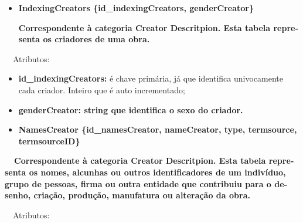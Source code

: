 \documentclass[letterpaper]{article}
\newcommand\textstyleStrongEmphasis[1]{\textbf{#1}}
\newcommand\liststyleLi{%
\renewcommand\labelitemi{{\textbullet}}
\renewcommand\labelitemii{[27A2?]}
\renewcommand\labelitemiii{{\textbullet}}
\renewcommand\labelitemiv{{\textbullet}}
}
\newcommand\liststyleLxiii{%
\renewcommand\labelitemi{[27A2?]}
\renewcommand\labelitemii{[27A2?]}
\renewcommand\labelitemiii{[27A2?]}
\renewcommand\labelitemiv{[27A2?]}
}
\begin{document}
\bigskip

\liststyleLi
\begin{itemize}
\item {\bfseries
IndexingCreators\textmd{ \{}\textmd{id\_indexingCreators}\textmd{,
genderCreator\}}}

{\bfseries
\foreignlanguage{english}{\textmd{Correspondente \`a categoria
}}\textstyleStrongEmphasis{\foreignlanguage{english}{Creator
Descritpion}}\foreignlanguage{english}{\textmd{. Esta
}}\textstyleStrongEmphasis{\foreignlanguage{english}{\textmd{tabela}}}\foreignlanguage{english}{\textmd{
representa os criadores de uma obra.}}}
\end{itemize}

\bigskip

{
\ \ Atributos:}

\liststyleLxiii
\begin{itemize}
\item {
\textbf{id\_indexingCreators:} \'e chave prim\'aria, j\'a que identifica
univocamente cada criador. Inteiro que \'e auto incrementado;}
\item {\bfseries
genderCreator:\textmd{ string que identifica o sexo do criador.}}
\end{itemize}

\bigskip

\liststyleLi
\begin{itemize}
\item {\bfseries
NamesCreator\textmd{ \{}\textmd{id\_namesCreator}\textmd{, nameCreator,
type, termsource, termsourceID\}}}
\end{itemize}
{\bfseries
\foreignlanguage{english}{\textmd{\ \ Correspondente \`a categoria
}}\textstyleStrongEmphasis{\foreignlanguage{english}{Creator
Descritpion}}\foreignlanguage{english}{\textmd{. Esta
}}\textstyleStrongEmphasis{\foreignlanguage{english}{\textmd{tabela}}}\foreignlanguage{english}{\textmd{
representa os nomes, alcunhas ou
}}\foreignlanguage{english}{\textmd{outros identificadores de um
indiv\'iduo, grupo de pessoas, firma ou outra entidade que contribuiu
para o desenho, cria\c{c}\~ao, produ\c{c}\~ao, manufatura ou
altera\c{c}\~ao da obra.}}}


\bigskip

{
\ \ Atributos:}
\end{document}
